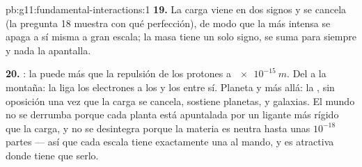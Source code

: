 \begin{solution}{pb:g11:fundamental-interactions:1}
\textbf{19.} La carga viene en dos signos y se cancela (la pregunta 18
muestra con qué perfección), de modo que la  más intensa se apaga
a sí misma a gran escala; la masa tiene un solo signo, se suma para
siempre y nada la apantalla.

\textbf{20.} : la  puede más que la repulsión de
los protones a $\qty{e-15}{m}$. Del  a la montaña: la  liga los electrones a los  y los  entre
sí. Planeta y más allá: la , sin oposición una vez que la
carga se cancela, sostiene planetas,  y galaxias. El mundo no se
derrumba porque cada planta está apuntalada por un ligante más rígido
que la carga, y no se desintegra porque la materia es neutra hasta unas
$10^{-18}$ partes --- así que cada escala tiene exactamente una 
al mando, y es atractiva donde tiene que serlo.
\end{solution}
